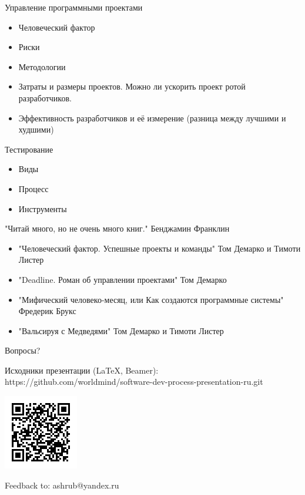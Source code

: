 \documentclass[aspectratio=169]{beamer}
\begin{document}
\begin{frame}{Управление программными проектами}
\begin{itemize}
\item Человеческий фактор
\pause
\item Риски
\pause
\item Методологии
\pause
\item Затраты и размеры проектов. Можно ли ускорить проект ротой разработчиков.
\pause
\item Эффективность разработчиков и её измерение (разница между лучшими и худшими)
\end{itemize}
\end{frame}

\begin{frame}{Тестирование}
\begin{itemize}
\item Виды
\pause
\item Процесс
\pause
\item Инструменты
\end{itemize}
\end{frame}

\begin{frame}{"Читай много, но не очень много книг." Бенджамин Франклин}
\begin{itemize}
\item "Человеческий фактор. Успешные проекты и команды" Том Демарко и Тимоти Листер
\pause
\item "Deadline. Роман об управлении проектами" Том Демарко
\pause
\item "Мифический человеко-месяц, или Как создаются программные системы" Фредерик Брукс
\pause
\item "Вальсируя с Медведями" Том Демарко и Тимоти Листер
\end{itemize}
\end{frame}

\begin{frame}{Вопросы?}
\begin{block}{Исходники презентации (LaTeX, Beamer):}
https://github.com/worldmind/software-dev-process-presentation-ru.git
\begin{center}
\includegraphics{qr-git-url.png}
\end{center}
\end{block}
\begin{block}{Feedback to: ashrub@yandex.ru}
\end{block}

\end{frame}
\end{document}
